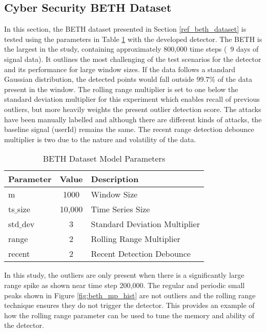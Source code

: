 \subsection{Cyber Security BETH Dataset}
\label{ref_results_beth_sim}
In this section, the BETH dataset presented in Section \ref{ref_beth_dataset} is tested  using the parameters in Table \ref{tab:beth_sim_params} with the developed detector. The BETH is the largest in the study, containing approximately 800,000 time steps (~9 days of signal data). It outlines the most challenging of the test scenarios for the detector and its performance for large window sizes. If the data follows a standard Gaussian distribution, the detected points would fall outside 99.7\% of the data present in the window. The rolling range multiplier is set to one below the standard deviation multiplier for this experiment which enables recall of previous outliers, but more heavily weights the present outlier detection score. The attacks have been manually labelled and although there are different kinds of attacks, the baseline signal (userId) remains the same. The recent range detection debounce multiplier is two due to the nature and volatility of the data.

\begin{table}[H]
\caption{BETH Dataset Model Parameters}
\begin{tabular}{|l|c|l|}
    \hline
	\textbf{Parameter} & \textbf{Value} & \textbf{Description} \\ \hline
	m & 1000 & Window Size \\ \hline
	ts$\_$size & 10,000 & Time Series Size \\ \hline
	std$\_$dev & 3 & Standard Deviation Multiplier \\ \hline
	range & 2 & Rolling Range Multiplier\\ \hline
	recent & 2 & Recent Detection Debounce\\ \hline
\end{tabular}
\label{tab:beth_sim_params}
\end{table}
 
In this study, the outliers are only present when there is a significantly large range spike as shown near time step 200,000. The regular and periodic small peaks shown in Figure \ref{fig:beth_mp_hist} are not outliers and the rolling range technique ensures they do not trigger the detector. This provides an example of how the rolling range parameter can be used to tune the memory and ability of the detector. 

